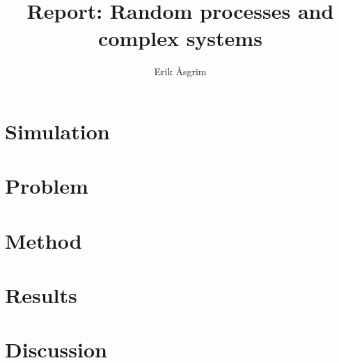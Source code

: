 \documentclass[a4paper,12pt]{article}
\title{Report: Random processes and complex systems}
\author{Erik Åsgrim}
\begin{document}
\maketitle

\section*{Simulation}

\section*{Problem}

\section*{Method}

\section*{Results}

\section*{Discussion}
\end{document}

